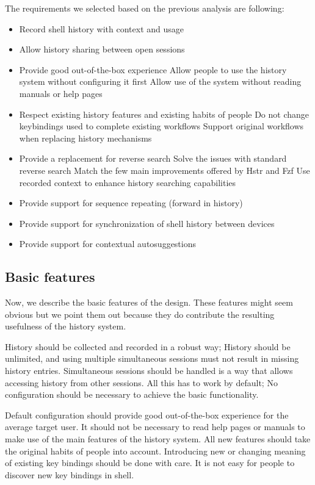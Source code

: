 The requirements we selected based on the previous analysis are following:

\begin{itemize}
    \item Record shell history with context and usage
    \item Allow history sharing between open sessions
    \item Provide good out-of-the-box experience
    \subitem Allow people to use the history system without configuring it first
    \subitem Allow use of the system without reading manuals or help pages
    \item Respect existing history features and existing habits of people
    \subitem Do not change keybindings used to complete existing workflows
    \subitem Support original workflows when replacing history mechanisms
    \item Provide a replacement for reverse search
    \subitem Solve the issues with standard reverse search
    \subitem Match the few main improvements offered by Hstr and Fzf
    \subitem Use recorded context to enhance history searching capabilities
    \item Provide support for sequence repeating (forward in history)
    \item Provide support for synchronization of shell history between devices
    \item Provide support for contextual autosuggestions
\end{itemize}



\subsection{Basic features}

Now, we describe the basic features of the design. These features might seem obvious but we point them out because they do contribute the resulting usefulness of the history system.

History should be collected and recorded in a robust way; History should be unlimited, and using multiple simultaneous sessions must not result in missing history entries. 
Simultaneous sessions should be handled is a way that allows accessing history from other sessions.
All this has to work by default; No configuration should be necessary to achieve the basic functionality. 

Default configuration should provide good out-of-the-box experience for the average target user. It should not be necessary to read help pages or manuals to make use of the main features of the history system. 
All new features should take the original habits of people into account. 
Introducing new or changing meaning of existing key bindings should be done with care. It is not easy for people to discover new key bindings in shell.


